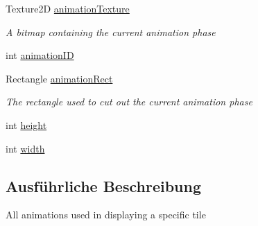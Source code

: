 \begin{DoxyCompactItemize}
Texture2\-D \hyperlink{class_gruppe22_1_1_client_1_1_tile_object_a4f7a5bb65030d656eb6e5755bb4678aa}{animation\-Texture}
\begin{DoxyCompactList}\small\item\em A bitmap containing the current animation phase \end{DoxyCompactList}\item 
int \hyperlink{class_gruppe22_1_1_client_1_1_tile_object_a6ad718b3f74074c310a6530d20d0c3c9}{animation\-I\-D}
\item 
Rectangle \hyperlink{class_gruppe22_1_1_client_1_1_tile_object_ad68010b4b4677968177f6d6ab0b26324}{animation\-Rect}
\begin{DoxyCompactList}\small\item\em The rectangle used to cut out the current animation phase \end{DoxyCompactList}\item 
int \hyperlink{class_gruppe22_1_1_client_1_1_tile_object_a6bfc3a726f20db8d708c172cf5488df9}{height}
\item 
int \hyperlink{class_gruppe22_1_1_client_1_1_tile_object_ad12970584aeb4e8ddcc748cbd24e11bd}{width}
\end{DoxyCompactItemize}


\subsection{Ausführliche Beschreibung}
All animations used in displaying a specific tile 



